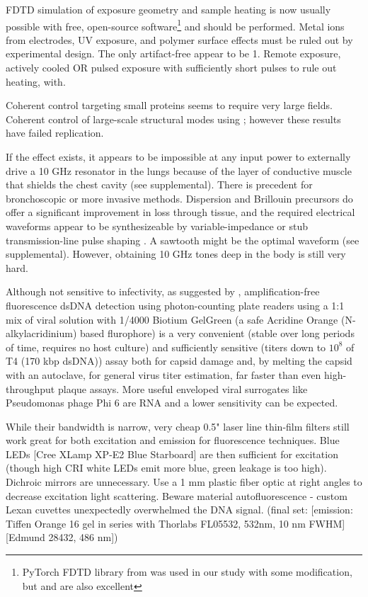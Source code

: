 \documentclass[paper.tex]{subfiles}
\begin{document}
FDTD simulation of exposure geometry and sample heating is now usually possible with free, open-source software\footnote{PyTorch FDTD library from \cite{Highly2019} was used in our study with some modification, but \cite{CUDAbased2019} and \cite{openEMS} are also excellent} and should be performed. Metal ions from electrodes, UV exposure, and polymer surface effects must be ruled out by experimental design. The only artifact-free appear to be 1. Remote exposure, actively cooled OR pulsed exposure with sufficiently short pulses to rule out heating, with. 

Coherent control targeting small proteins seems to require very large fields. Coherent control of large-scale structural modes using ; however these results have failed replication.

If the effect exists, it appears to be impossible at any input power to externally drive a 10 GHz resonator in the lungs because of the layer of conductive muscle that shields the chest cavity (see supplemental). There is precedent for bronchoscopic \cite{Flexible2019}\cite{Antenna2018} or more invasive methods. Dispersion and Brillouin precursors do offer a significant improvement in loss through tissue, and the required electrical waveforms appear to be synthesizeable by variable-impedance or stub transmission-line pulse shaping\cite{Arbitrarya} . A sawtooth might be the optimal waveform (see supplemental). However, obtaining 10 GHz tones deep in the body is still very hard.

Although not sensitive to infectivity, as suggested by \cite{Quantification2020}, amplification-free fluorescence dsDNA detection using photon-counting plate readers using a 1:1 mix of viral solution with 1/4000 Biotium GelGreen (a safe Acridine Orange (N-alkylacridinium) based flurophore) is a very convenient (stable over long periods of time, requires no host culture) and sufficiently sensitive (titers down to $10^8$ of T4 (170 kbp dsDNA)) assay both for capsid damage and, by melting the capsid with an autoclave, for general virus titer estimation, far faster than even high-throughput plaque assays. More useful enveloped viral surrogates like Pseudomonas phage Phi 6 are RNA and a lower sensitivity can be expected. 

While their bandwidth is narrow, very cheap 0.5" laser line thin-film filters still work great for both excitation and emission for fluorescence techniques. Blue LEDs [Cree XLamp XP-E2 Blue Starboard] are then sufficient for excitation (though high CRI white LEDs emit more blue, green leakage is too high). Dichroic mirrors are unnecessary. Use a 1 mm plastic fiber optic at right angles to decrease excitation light scattering. Beware material autofluorescence - custom Lexan cuvettes unexpectedly overwhelmed the DNA signal. (final set: [emission: Tiffen Orange 16 gel in series with Thorlabs FL05532, 532nm, 10 nm FWHM] [Edmund 28432, 486 nm])
\end{document}
